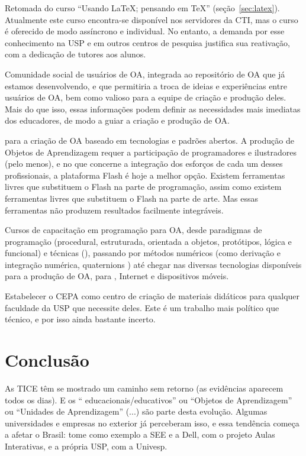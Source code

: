 \begin{compactitem}
	\item Retomada do curso ``Usando \LaTeX; pensando em \TeX'' (seção~\ref{sec:latex}). Atualmente este curso encontra-se disponível nos servidores da CTI, mas o curso é oferecido de modo assíncrono e individual. No entanto, a demanda por esse conhecimento na USP e em outros centros de pesquisa justifica sua reativação, com a dedicação de tutores  aos alunos.
	\item Comunidade social de usuários de OA, integrada ao repositório de OA que já estamos desenvolvendo, e que permitiria a troca de ideias e experiências entre usuários de OA, bem como valioso  para a equipe de criação e produção deles. Mais do que isso, essas informações podem definir as necessidades mais imediatas dos educadores, de modo a guiar a criação e produção de OA.
	\item {} para a criação de OA baseado em tecnologias e padrões abertos. A produção de Objetos de Aprendizagem requer a participação de programadores e ilustradores (pelo menos), e no que concerne a integração dos esforços de cada um desses profissionais, a plataforma Flash é hoje a melhor opção. Existem ferramentas livres que substituem o Flash na parte de programação, assim como existem ferramentas livres que substituem o Flash na parte de arte. Mas essas ferramentas não produzem resultados facilmente integráveis.
	\item Cursos de capacitação em programação para OA, desde paradigmas de programação (procedural, estruturada, orientada a objetos, protótipos, lógica e funcional) e técnicas (), passando por métodos numéricos (como derivação e integração numérica, quaternions \etc) até chegar nas diversas tecnologias disponíveis para a produção de OA, para , Internet e dispositivos móveis.
	\item Estabelecer o CEPA como centro de criação de materiais didáticos para qualquer faculdade da USP que necessite deles. Este é um trabalho mais político que técnico, e por isso ainda bastante incerto.
\end{compactitem}

\section{Conclusão}

As TICE têm se mostrado um caminho sem retorno (as evidências aparecem todos os dias). E os `` educacionais/educativos'' ou ``Objetos de Aprendizagem'' ou ``Unidades de Aprendizagem'' (...) são parte desta evolução. Algumas universidades e empresas no exterior já perceberam isso, e essa tendência começa a afetar o Brasil: tome como exemplo a SEE e a Dell, com o projeto Aulas Interativas, e a própria USP, com a Univesp.

